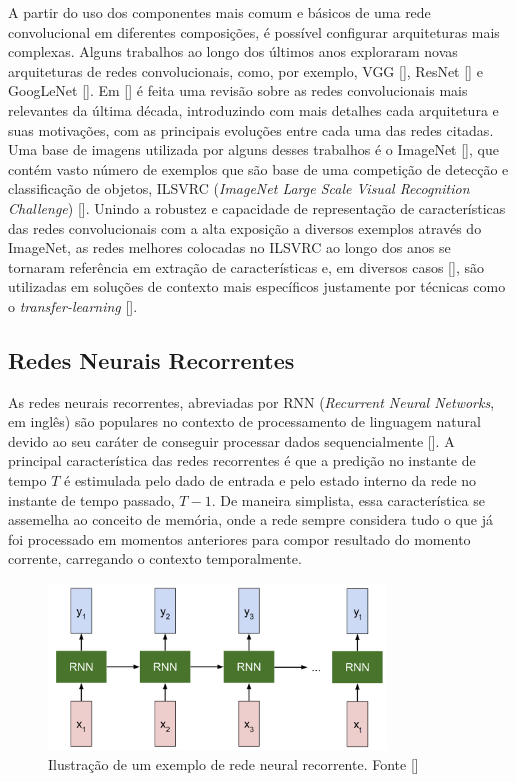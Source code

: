 A partir do uso dos componentes mais comum e básicos de uma rede convolucional em diferentes composições, é possível configurar arquiteturas mais complexas. 
Alguns trabalhos ao longo dos últimos anos exploraram novas arquiteturas de redes convolucionais, como, por exemplo, VGG [], 
ResNet [] e GoogLeNet []. Em [] é feita uma revisão sobre as redes convolucionais mais relevantes da última década, introduzindo com mais detalhes cada arquitetura e suas motivações, com as principais evoluções entre cada uma das redes citadas. 
Uma base de imagens utilizada por alguns desses trabalhos é o ImageNet [], que contém vasto número de exemplos que são base de uma 
competição de detecção e classificação de objetos, ILSVRC (\textit{ImageNet Large Scale Visual Recognition Challenge}) []. 
Unindo a robustez e capacidade de representação de características das redes convolucionais com a alta exposição a diversos exemplos através do ImageNet, 
as redes melhores colocadas no ILSVRC ao longo dos anos se tornaram referência em extração de características e, em diversos casos [], 
são utilizadas em soluções de contexto mais específicos justamente por técnicas como o \textit{transfer-learning} [].


\subsection{Redes Neurais Recorrentes}
As redes neurais recorrentes, abreviadas por RNN (\textit{Recurrent Neural Networks}, em inglês) são populares no contexto de processamento de 
linguagem natural devido ao seu caráter de conseguir processar dados sequencialmente []. A principal característica das redes recorrentes 
é que a predição no instante de tempo $T$ é estimulada pelo dado de entrada e pelo estado interno da rede no instante de tempo passado, $T - 1$. De maneira 
simplista, essa característica se assemelha ao conceito de memória, onde a rede sempre considera tudo o que já foi processado em momentos anteriores para 
compor resultado do momento corrente, carregando o contexto temporalmente.

\begin{figure}
    \centering
    \includegraphics[width=0.8\textwidth]{figs/theory-example-rnn.png}
    \caption{Ilustração de um exemplo de rede neural recorrente. Fonte []}
    \label{fig:theory-rnn-example}
\end{figure}

